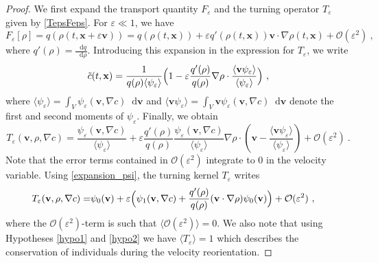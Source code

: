 \documentclass[review,onefignum,onetabnum]{siamart220329}
\newcommand*\diff{\mathop{}\!\mathrm{d}}
\begin{document}
\begin{proof}
We first expand the transport quantity $F_\varepsilon$ and the turning operator $T_\varepsilon$ given by \cref{TepsFeps}. For $\varepsilon \ll 1$, we have
\begin{equation}
  F_\varepsilon[\rho] =  q(\rho(t,\mathbf{x}+\varepsilon \mathbf{v}))=q(\rho(t,\mathbf{x}))+\varepsilon q'(\rho(t,\mathbf{x})) \mathbf{v}\cdot \nabla\rho(t,\mathbf{x})+\mathcal{O}(\varepsilon^2)\ ,\label{eq: F scaled}
\end{equation}
where $q'(\rho)=\frac{\diff q}{\diff\rho}$. Introducing this expansion in the expression for $T_\varepsilon$, we write
\begin{equation*}
    \tilde{c}(t,\mathbf{x})=\frac{1}{q(\rho) \langle\psi_\varepsilon\rangle}\Bigl(1-\varepsilon\frac{q'(\rho) }{q(\rho) } \nabla\rho \cdot \frac{\langle \mathbf{v}\psi_\varepsilon\rangle}{\langle\psi_\varepsilon\rangle} \Bigr)\ ,
\end{equation*}
\noindent where $\langle\psi_\varepsilon\rangle =\int_V\psi_\varepsilon(\mathbf{v},\nabla c)\diff \mathbf{v}$ and $\langle \mathbf{v}\psi_\varepsilon\rangle = \int_V \mathbf{v} \psi_\varepsilon(\mathbf{v},\nabla c)\diff \mathbf{v}$ denote the first and second moments of $\psi_\varepsilon$. Finally, we obtain 
{\begin{equation*}
  T_\varepsilon (\mathbf{v},\rho,\nabla c)=\frac{\psi_\varepsilon(\mathbf{v},\nabla c)}{\langle\psi_\varepsilon\rangle} + \varepsilon\frac{q'(\rho)}{q(\rho)}\frac{\psi_\varepsilon(\mathbf{v},\nabla c)}{\langle\psi_\varepsilon\rangle} \nabla\rho \cdot \left(\mathbf{v} - \frac{\langle \mathbf{v}\psi_\varepsilon\rangle}{\langle\psi_\varepsilon\rangle}\right) +\mathcal{O}(\varepsilon^2)\ .
\end{equation*}}
Note that the error terms contained in $\mathcal{O}(\varepsilon^2)$ integrate to 0 in the velocity variable. Using \cref{expansion_psi}, the turning kernel $T_\varepsilon$ writes
\begin{align}
    T_\varepsilon(\mathbf{v},\rho,\nabla c)=&\psi_0(\mathbf{v})+\varepsilon\Bigl(  \psi_1(\mathbf{v},\nabla c)+\frac{q'(\rho)}{q(\rho)}(\mathbf{v}\cdot\nabla\rho)\psi_0(\mathbf{v})\Bigr) + {\mathcal{O}(\varepsilon^2)} \ ,\label{eq: turning operator scaled}
\end{align}
{where the $\mathcal{O}(\varepsilon^2)$-term {is such that} $\langle\mathcal{O}(\varepsilon^2)\rangle=0$. We also note that using Hypotheses \cref{hypo1} and \cref{hypo2} we have $\langle T_\varepsilon\rangle=1$ which describes the conservation of individuals during the velocity reorientation.}

\end{proof}
\end{document}
